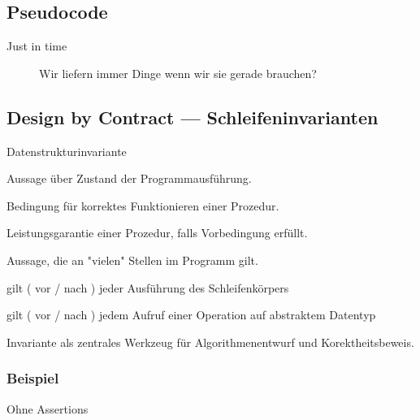 \documentclass[a4paper]{scrartcl}
\begin{document}
 		\subsection{Pseudocode}
 			\begin{description}
 				\item[Just in time] 
 					Wir liefern immer Dinge wenn wir sie gerade brauchen?
 			\end{description}
 		
 		\subsection{Design by Contract --- Schleifeninvarianten}
 			\begin{labeling}{Datenstrukturinvariante}
 				\item[assert] 
 					Aussage über Zustand der Programmausführung.
 					
 				\item[Vorbedingung] 
 					Bedingung für korrektes Funktionieren einer Prozedur.
 					
 				\item[Nachbedingung] 
 					Leistungsgarantie einer Prozedur, falls Vorbedingung erfüllt.
 					
 				\item[Invariante]
 					Aussage, die an "vielen" Stellen im Programm gilt.
 					 
 				\item[Schleifeninvariante] 
 					gilt ( vor / nach ) jeder Ausführung des Schleifenkörpers
 					
 				\item[Datenstrukturinvariante] 
 					gilt ( vor / nach ) jedem Aufruf einer Operation auf abstraktem Datentyp
 					
 			\end{labeling}
 			Invariante als zentrales Werkzeug für Algorithmenentwurf und Korektheitsbeweis.	
 		
 		\subsubsection{Beispiel}
 		
 				\begin{algorithm}
 				\caption{Ohne Assertions}
 				\DontPrintSemicolon
 				
 			\end{algorithm}
 			
\end{document}
